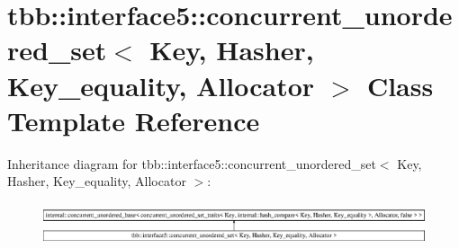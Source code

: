 \hypertarget{classtbb_1_1interface5_1_1concurrent__unordered__set}{}\section{tbb\+:\+:interface5\+:\+:concurrent\+\_\+unordered\+\_\+set$<$ Key, Hasher, Key\+\_\+equality, Allocator $>$ Class Template Reference}
\label{classtbb_1_1interface5_1_1concurrent__unordered__set}
Inheritance diagram for tbb\+:\+:interface5\+:\+:concurrent\+\_\+unordered\+\_\+set$<$ Key, Hasher, Key\+\_\+equality, Allocator $>$\+:\begin{figure}[H]
\begin{center}
\leavevmode
\includegraphics[height=1.247216cm]{classtbb_1_1interface5_1_1concurrent__unordered__set}
\end{center}
\end{figure}
